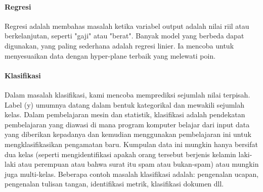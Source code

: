 \paragraph{Regresi}\hspace{0pt} \par
Regresi adalah membahas masalah ketika variabel output adalah nilai riil atau berkelanjutan, seperti "gaji" atau "berat". Banyak model yang berbeda dapat digunakan, yang paling sederhana adalah regresi linier. Ia mencoba untuk menyesuaikan data dengan hyper-plane terbaik yang melewati poin.

\paragraph{Klasifikasi}\hspace{0pt} \par
Dalam masalah klasifikasi, kami mencoba memprediksi sejumlah nilai terpisah. Label (y) umumnya datang dalam bentuk kategorikal dan mewakili sejumlah kelas. Dalam pembelajaran mesin dan statistik, klasifikasi adalah pendekatan pembelajaran yang diawasi di mana program komputer belajar dari input data yang diberikan kepadanya dan kemudian menggunakan pembelajaran ini untuk mengklasifikasikan pengamatan baru. Kumpulan data ini mungkin hanya bersifat dua kelas (seperti mengidentifikasi apakah orang tersebut berjenis kelamin laki-laki atau perempuan atau bahwa surat itu spam atau bukan-spam) atau mungkin juga multi-kelas. Beberapa contoh masalah klasifikasi adalah: pengenalan ucapan, pengenalan tulisan tangan, identifikasi metrik, klasifikasi dokumen dll.

